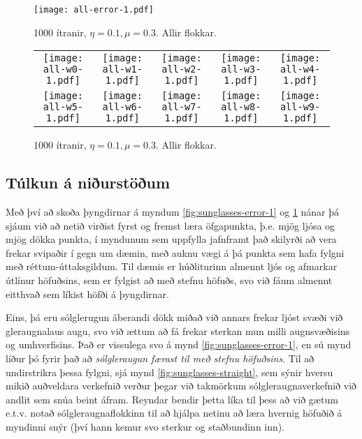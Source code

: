 \documentclass[a4paper,icelandic]{article}
\begin{document}
\begin{figure}[h!]
  \begin{center}
    \texttt{[image: all-error-1.pdf]}
  \end{center}
  \caption{1000 ítranir, $\eta=0.1,\mu=0.3$. Allir flokkar.}
  \label{fig:all-error-1}
\end{figure}
\begin{figure}[h!]
  \begin{center}
    \begin{tabular}{ccccc}
        \texttt{[image: all-w0-1.pdf]}
      & \texttt{[image: all-w1-1.pdf]}
      & \texttt{[image: all-w2-1.pdf]}
      & \texttt{[image: all-w3-1.pdf]}
      & \texttt{[image: all-w4-1.pdf]}
      \\
        \texttt{[image: all-w5-1.pdf]}
      & \texttt{[image: all-w6-1.pdf]}
      & \texttt{[image: all-w7-1.pdf]}
      & \texttt{[image: all-w8-1.pdf]}
      & \texttt{[image: all-w9-1.pdf]}
    \end{tabular}
  \end{center}
  \caption{1000 ítranir, $\eta=0.1,\mu=0.3$. Allir flokkar.}
  \label{fig:all-weights-1}
\end{figure}

\subsection{Túlkun á niðurstöðum}

Með því að skoða þyngdirnar á myndum \ref{fig:sunglasses-error-1} og
\ref{fig:all-error-1} nánar þá sjáum við að netið virðist fyrst og
fremst læra öfgapunkta, þ.e. mjög ljósa og mjög dökka punkta, í myndunum
sem uppfylla jafnframt það skilyrði að vera frekar svipaðir í gegn um
dæmin, með auknu vægi á þá punkta sem hafa fylgni með
réttum-úttaksgildum. Til dæmis er húðliturinn almennt ljós og afmarkar
útlínur höfuðsins, sem er fylgist að með stefnu höfuðs, svo við fáum
almennt eitthvað sem líkist höfði á þyngdirnar. 

Eins, þá eru sólglerugun áberandi dökk miðað við annars frekar ljóst
svæði við gleraugnalaus augu, svo við ættum að fá frekar sterkan mun
milli augnsvæðisins og umhverfisins. Það er vissulega svo á mynd
\ref{fig:sunglasses-error-1}, en sú mynd líður þó fyrir það að
\emph{sólgleraugun færast til með stefnu höfuðsins}. Til að undirstrikra
þessa fylgni, sjá mynd \ref{fig:sunglasses-straight}, sem sýnir hversu
mikið auðveldara verkefnið verður þegar við takmörkum
sólgleraugnaverkefnið við andlit sem snúa beint áfram. Reyndar bendir
þetta líka til þess að við gætum e.t.v. notað sólgleraugnaflokkinn til
að hjálpa netinu að læra hvernig höfuðið á myndinni snýr (því hann kemur
svo sterkur og staðbundinn inn).
\end{document}
